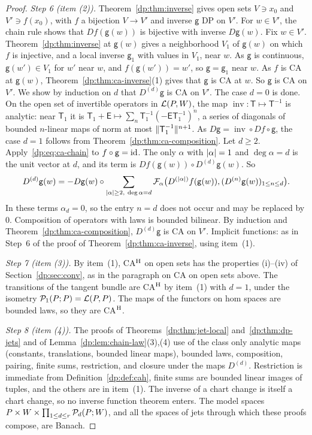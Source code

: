\begin{proof}
\emph{Step 6 (item (2)).} Theorem~\ref{dp:thm:inverse} gives open sets $V\ni x_0$ and $V'\ni f(x_0)$, with $f$ a bijection $V\to V'$ and inverse $\mathsf g$ DP on $V'$. For $w\in V'$, the chain rule shows that $Df(\mathsf g(w))$ is bijective with inverse $D\mathsf g(w)$. Fix $w\in V'$. Theorem~\ref{dp:thm:inverse} at $\mathsf g(w)$ gives a neighborhood $V_1$ of $\mathsf g(w)$ on which $f$ is injective, and a local inverse $\mathsf g_1$ with values in $V_1$, near $w$. As $\mathsf g$ is continuous, $\mathsf g(w')\in V_1$ for $w'$ near $w$, and $f(\mathsf g(w'))=w'$, so $\mathsf g=\mathsf g_1$ near $w$. As $f$ is CA at $\mathsf g(w)$, Theorem~\ref{dp:thm:ca-inverse}(1) gives that $\mathsf g$ is CA at $w$. So $\mathsf g$ is CA on $V'$. We show by induction on $d$ that $D^{(d)}\mathsf g$ is CA on $V'$. The case $d=0$ is done. On the open set of invertible operators in $\mathcal L(P,W)$, the map $\operatorname{inv}\colon\mathsf T\mapsto\mathsf T^{-1}$ is analytic: near $\mathsf T_1$ it is $\mathsf T_1+\mathsf E\mapsto\sum_n\mathsf T_1^{-1}(-\mathsf E\mathsf T_1^{-1})^n$, a series of diagonals of bounded $n$-linear maps of norm at most $\lVert \mathsf T_1^{-1}\rVert^{n+1}$. As $D\mathsf g=\operatorname{inv}\circ Df\circ\mathsf g$, the case $d=1$ follows from Theorem~\ref{dp:thm:ca-composition}. Let $d\ge2$. Apply~\eqref{dp:eq:ca-chain} to $f\circ\mathsf g=\mathrm{id}$. The only $\alpha$ with $\lvert \alpha\rvert=1$ and $\deg\alpha=d$ is the unit vector at $d$, and its term is $Df(\mathsf g(w))\circ D^{(d)}\mathsf g(w)$. So
\[
 D^{(d)}\mathsf g(w)=-D\mathsf g(w)\circ\sum_{\lvert \alpha\rvert\ge2,\ \deg\alpha=d}\mathcal F_\alpha\bigl(D^{(\lvert \alpha\rvert)}f(\mathsf g(w)),(D^{(n)}\mathsf g(w))_{1\le n\le d}\bigr).
\]
In these terms $\alpha_d=0$, so the entry $n=d$ does not occur and may be replaced by $0$. Composition of operators with laws is bounded bilinear. By induction and Theorem~\ref{dp:thm:ca-composition}, $D^{(d)}\mathsf g$ is CA on $V'$. Implicit functions: as in Step~6 of the proof of Theorem~\ref{dp:thm:ca-inverse}, using item~(1).

\emph{Step 7 (item (3)).} By item~(1), CA$^{\rm H}$ on open sets has the properties (i)--(iv) of Section~\ref{dp:sec:conv}, as in the paragraph on CA on open sets above. The transitions of the tangent bundle are CA$^{\rm H}$ by item~(1) with $d=1$, under the isometry $\mathcal P_1(P;P)=\mathcal L(P,P)$. The maps of the functors on hom spaces are bounded laws, so they are CA$^{\rm H}$.

\emph{Step 8 (item (4)).} The proofs of Theorems~\ref{dp:thm:jet-local} and~\ref{dp:thm:dp-jets} and of Lemma~\ref{dp:lem:chain-law}(3),(4) use of the class only analytic maps (constants, translations, bounded linear maps), bounded laws, composition, pairing, finite sums, restriction, and closure under the maps $D^{(d)}$. Restriction is immediate from Definition~\ref{dp:def:cah}, finite sums are bounded linear images of tuples, and the others are in item~(1). The inverse of a chart change is itself a chart change, so no inverse function theorem enters. The model spaces $P\times W\times\prod_{1\le d\le r}\mathcal P_d(P;W)$, and all the spaces of jets through which these proofs compose, are Banach.


\end{proof}
